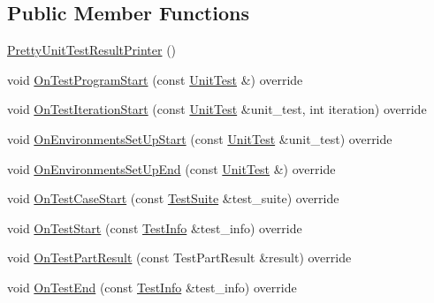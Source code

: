\subsection*{Public Member Functions}
\begin{DoxyCompactItemize}
\item 
\mbox{\hyperlink{classtesting_1_1internal_1_1_pretty_unit_test_result_printer_a9219a4263ef0057c98a2a2a41f35ee15}{Pretty\+Unit\+Test\+Result\+Printer}} ()
\item 
void \mbox{\hyperlink{classtesting_1_1internal_1_1_pretty_unit_test_result_printer_a248840fde373e65a25eaaa1d2a0f3065}{On\+Test\+Program\+Start}} (const \mbox{\hyperlink{classtesting_1_1_unit_test}{Unit\+Test}} \&) override
\item 
void \mbox{\hyperlink{classtesting_1_1internal_1_1_pretty_unit_test_result_printer_a0e7e8909452ef92aaf02f4cffde5ee28}{On\+Test\+Iteration\+Start}} (const \mbox{\hyperlink{classtesting_1_1_unit_test}{Unit\+Test}} \&unit\+\_\+test, int iteration) override
\item 
void \mbox{\hyperlink{classtesting_1_1internal_1_1_pretty_unit_test_result_printer_ac17a4a708aca7df5876e48868408a2be}{On\+Environments\+Set\+Up\+Start}} (const \mbox{\hyperlink{classtesting_1_1_unit_test}{Unit\+Test}} \&unit\+\_\+test) override
\item 
void \mbox{\hyperlink{classtesting_1_1internal_1_1_pretty_unit_test_result_printer_a9853207ad1aedfe89c72f8047ac3541a}{On\+Environments\+Set\+Up\+End}} (const \mbox{\hyperlink{classtesting_1_1_unit_test}{Unit\+Test}} \&) override
\item 
void \mbox{\hyperlink{classtesting_1_1internal_1_1_pretty_unit_test_result_printer_a168314907137d4a9320a685c33b80e67}{On\+Test\+Case\+Start}} (const \mbox{\hyperlink{classtesting_1_1_test_suite}{Test\+Suite}} \&test\+\_\+suite) override
\item 
void \mbox{\hyperlink{classtesting_1_1internal_1_1_pretty_unit_test_result_printer_a079ac0eb5f8cdd2511cfd33ef931338b}{On\+Test\+Start}} (const \mbox{\hyperlink{classtesting_1_1_test_info}{Test\+Info}} \&test\+\_\+info) override
\item 
void \mbox{\hyperlink{classtesting_1_1internal_1_1_pretty_unit_test_result_printer_a89caba1698d6999082e938f814dd8ece}{On\+Test\+Part\+Result}} (const Test\+Part\+Result \&result) override
\item 
void \mbox{\hyperlink{classtesting_1_1internal_1_1_pretty_unit_test_result_printer_a085f90bb9f3128d8d8864c19e1e188ef}{On\+Test\+End}} (const \mbox{\hyperlink{classtesting_1_1_test_info}{Test\+Info}} \&test\+\_\+info) override

\end{DoxyCompactItemize}
